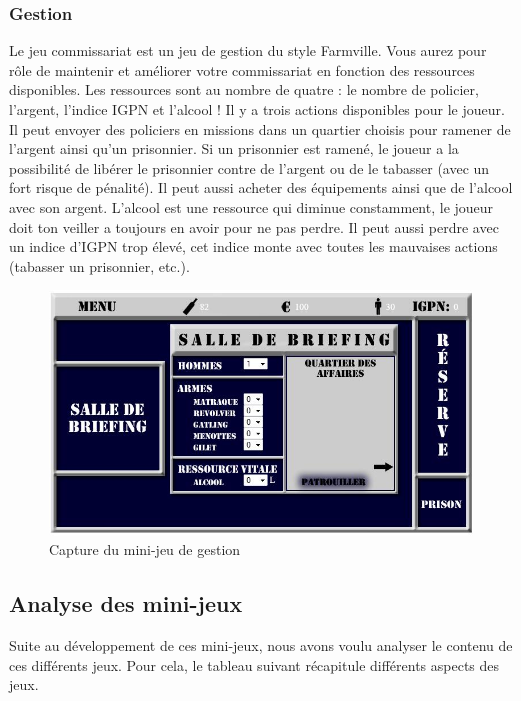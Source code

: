 \subsubsection{Gestion}

Le jeu commissariat est  un jeu de gestion du style Farmville. 
Vous aurez pour rôle de maintenir et améliorer votre commissariat en fonction des ressources disponibles.
 Les ressources sont au nombre de quatre : le nombre de policier, l’argent, l’indice IGPN et l’alcool ! 
Il y a trois actions disponibles pour le joueur. Il peut envoyer des policiers en missions dans un quartier 
choisis pour ramener de l’argent ainsi qu’un prisonnier.  Si un prisonnier est ramené, le joueur a la possibilité 
de libérer le prisonnier contre de l’argent ou de le tabasser (avec un fort risque de pénalité). 
Il peut aussi acheter des équipements ainsi que de l’alcool avec son argent. L’alcool est une ressource qui diminue constamment, 
le joueur doit ton veiller a toujours en avoir pour ne pas perdre. Il peut aussi perdre avec un indice d’IGPN trop élevé, cet indice 
monte avec toutes les mauvaises actions (tabasser un prisonnier, etc.).

\begin{figure}
 \includegraphics[width=\linewidth]{img/capturejeu_gestion2}
 \caption{Capture du mini-jeu de gestion}
 \label{fig:game_gestion}
\end{figure}

\subsection{Analyse des mini-jeux}

Suite au développement de ces mini-jeux, nous avons voulu analyser le contenu de ces différents jeux.
Pour cela, le tableau suivant récapitule différents aspects des jeux.

